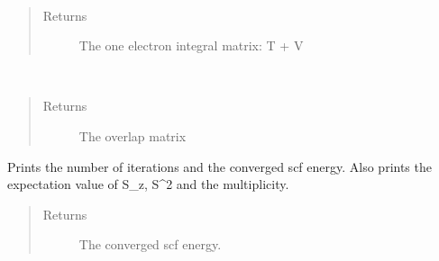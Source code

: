 \documentclass[letterpaper,10pt,english]{sphinxmanual}
\begin{document}
\begin{fulllineitems}
\begin{fulllineitems}
\begin{quote}
\begin{description}
\end{description}\end{quote}

\end{fulllineitems}


\begin{fulllineitems}
\label{\detokenize{UHF:ghf.UHF.UHF.get_one_e}}~\begin{quote}\begin{description}
\item[{Returns}] \leavevmode
The one electron integral matrix: T + V

\end{description}\end{quote}

\end{fulllineitems}


\begin{fulllineitems}
\label{\detokenize{UHF:ghf.UHF.UHF.get_ovlp}}~\begin{quote}\begin{description}
\item[{Returns}] \leavevmode
The overlap matrix

\end{description}\end{quote}

\end{fulllineitems}


\begin{fulllineitems}
\label{\detokenize{UHF:ghf.UHF.UHF.get_scf_solution}}
Prints the number of iterations and the converged scf energy.
Also prints the expectation value of S\_z, S\textasciicircum{}2 and the multiplicity.
\begin{quote}\begin{description}
\item[{Returns}] \leavevmode
The converged scf energy.


\end{description}
\end{quote}
\end{fulllineitems}
\end{fulllineitems}
\end{document}
